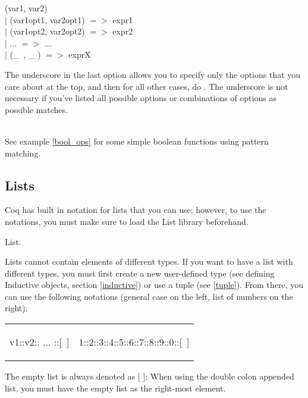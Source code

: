 \begin{code}
	\match (var1, var2) \with 					\\
	$\mid$ (var1opt1, var2opt1) $=>$ expr1		\\
	$\mid$ (var1opt2, var2opt2) $=>$ expr2		\\
	$\mid$ ...	$=>$ ...						\\
	$\mid$ (\_\ , \_ ) $=>$ exprX				\\
	\End
\end{code}

\noindent
The underscore in the last option allows you to specify only the options that you care about at the top, and then for all other cases, do . The underscore is not necessary if you've listed all possible options or combinations of options as possible matches.

~\\ \noindent
See example \ref{bool_ops} for some simple boolean functions using pattern matching.





\subsection{Lists} \label{list} 
Coq has built in notation for lists that you can use; however, to use the notations, you must make sure to load the List library beforehand. 
\begin{code}
	\Load List.
\end{code}


\noindent
Lists cannot contain elements of different types. 
If you want to have a list with different types, you must first create a new user-defined type (see defining Inductive objects, section \ref{inductive}) or use a tuple (see \ref{tuple}).
From there, you can use the following notations (general case on the left, list of numbers on the right):
\hspace{-1cm}
\begin{tabular}{p{8cm} p{8cm}}
\begin{code}
	v1::v2:: ... ::[\ ]
\end{code}
\begin{code}
	[ v1; ...; vN ]
\end{code}
&
\begin{code}
	1::2::3::4::5::6::7::8::9::0::[\ ]
\end{code}
\begin{code}
	[ 1; 2; 3; 4; 5; 6; 7; 8; 9; 0 ]
\end{code} 
\end{tabular}
The empty list is always denoted as [ ]; When using the double colon appended list, you must have the empty list as the right-most element.


